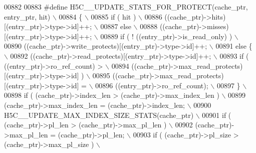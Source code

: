 \begin{DoxyCode}
00882 
00883 \textcolor{preprocessor}{#define H5C\_\_UPDATE\_STATS\_FOR\_PROTECT(cache\_ptr, entry\_ptr, hit)            \(\backslash\)}
00884 \textcolor{preprocessor}{\{                                                                           \(\backslash\)}
00885 \textcolor{preprocessor}{    if ( hit )                                                              \(\backslash\)}
00886 \textcolor{preprocessor}{        ((cache\_ptr)->hits)[(entry\_ptr)->type->id]++;                       \(\backslash\)}
00887 \textcolor{preprocessor}{    else                                                                    \(\backslash\)}
00888 \textcolor{preprocessor}{        ((cache\_ptr)->misses)[(entry\_ptr)->type->id]++;                     \(\backslash\)}
00889 \textcolor{preprocessor}{    if ( ! ((entry\_ptr)->is\_read\_only) )                                    \(\backslash\)}
00890 \textcolor{preprocessor}{        ((cache\_ptr)->write\_protects)[(entry\_ptr)->type->id]++;             \(\backslash\)}
00891 \textcolor{preprocessor}{    else \{                                                                  \(\backslash\)}
00892 \textcolor{preprocessor}{        ((cache\_ptr)->read\_protects)[(entry\_ptr)->type->id]++;              \(\backslash\)}
00893 \textcolor{preprocessor}{        if ( ((entry\_ptr)->ro\_ref\_count) >                                  \(\backslash\)}
00894 \textcolor{preprocessor}{                ((cache\_ptr)->max\_read\_protects)[(entry\_ptr)->type->id] )   \(\backslash\)}
00895 \textcolor{preprocessor}{            ((cache\_ptr)->max\_read\_protects)[(entry\_ptr)->type->id] =       \(\backslash\)}
00896 \textcolor{preprocessor}{                    ((entry\_ptr)->ro\_ref\_count);                            \(\backslash\)}
00897 \textcolor{preprocessor}{    \}                                                                       \(\backslash\)}
00898 \textcolor{preprocessor}{    if ( (cache\_ptr)->index\_len > (cache\_ptr)->max\_index\_len )              \(\backslash\)}
00899 \textcolor{preprocessor}{        (cache\_ptr)->max\_index\_len = (cache\_ptr)->index\_len;                \(\backslash\)}
00900 \textcolor{preprocessor}{    H5C\_\_UPDATE\_MAX\_INDEX\_SIZE\_STATS(cache\_ptr)                             \(\backslash\)}
00901 \textcolor{preprocessor}{    if ( (cache\_ptr)->pl\_len > (cache\_ptr)->max\_pl\_len )                    \(\backslash\)}
00902 \textcolor{preprocessor}{        (cache\_ptr)->max\_pl\_len = (cache\_ptr)->pl\_len;                      \(\backslash\)}
00903 \textcolor{preprocessor}{    if ( (cache\_ptr)->pl\_size > (cache\_ptr)->max\_pl\_size )                  \(\backslash\)}

\end{DoxyCode}
